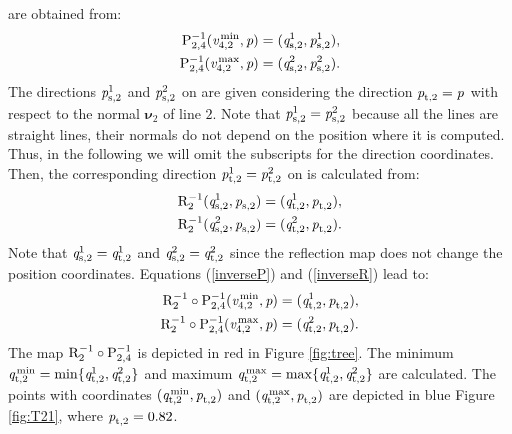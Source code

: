 are obtained from:
\begin{equation}\label{inverseP}
\begin{split}
 \mathrm{P}_{{2,4}}^{-1}
(\textit{v}_{4,2}^\textrm{\,min}, \textit{p}) &=  (\textit{q}_{\textrm{s,} \textit{$2$}}^1, \textit{p}_{\textrm{s,} \textit{$2$}}^1), \\
 \mathrm{P}_{{2,4}}^{-1}
(\textit{v}_{4,2}^\textrm{\,max}, \textit{p}) &=  (\textit{q}_{\textrm{s,} \textit{$2$}}^2, \textit{p}_{\textrm{s,} \textit{$2$}}^2).
\end{split}
\end{equation}
 The directions
$\textit{p}_{\textrm{s,} \textit{$2$}}^1$ and $\textit{p}_{\textrm{s,} \textit{$2$}}^2 $ on 
are given considering the direction $\textit{p}_{\textrm{t,} \textit{$2$}} = \textit{p}_{\textrm{} \textit{}}$ with respect to the normal
$\boldsymbol{\nu}_{2}$ of line $2$.
 Note that $\textit{p}_{\textrm{s,} \textit{$2$}}^1=\textit{p}_{\textrm{s,} \textit{$2$}}^2$ because all the lines are straight lines, their normals do not depend on the position where it is computed. Thus, in the following we will omit the subscripts for the direction coordinates.
 Then, the corresponding direction $\textit{p}_{\textrm{t,} \textit{$2$}}^1=\textit{p}_{\textrm{t,} \textit{$2$}}^2$ on 
 is calculated from:
\begin{equation}\label{inverseR}
\begin{split}
\mathrm{R}_{{2}}^{-1}(\textit{q}_{\textrm{s,} \textit{$2$}}^1, \textit{p}_{\textrm{s,} \textit{$2$}}) &= (\textit{q}_{\textrm{t,} \textit{$2$}}^1, \textit{p}_{\textrm{t,} \textit{$2$}}), \\
\mathrm{R}_{{2}}^{-1}(\textit{q}_{\textrm{s,} \textit{$2$}}^2, \textit{p}_{\textrm{s,} \textit{$2$}}) &= (\textit{q}_{\textrm{t,} \textit{$2$}}^2, \textit{p}_{\textrm{t,} \textit{$2$}}).
\end{split}
\end{equation}
Note that $\textit{q}_{\textrm{s,} \textit{$2$}}^1 = \textit{q}_{\textrm{t,} \textit{$2$}}^1$ and $\textit{q}_{\textrm{s,} \textit{$2$}}^2= \textit{q}_{\textrm{t,} \textit{$2$}}^2$ since the reflection map does not change the position coordinates.
 Equations (\ref{inverseP}) and (\ref{inverseR}) lead to: \begin{equation}
\begin{split}
\mathrm{R}_{{2}}^{-1}\circ \mathrm{P}_{{2,4}}^{-1}(\textit{v}_{4,2}^\textrm{\,min}, \textit{p}) &= (\textit{q}_{\textrm{t,} \textit{$2$}}^1, \textit{p}_{\textrm{t,} \textit{$2$}}),\\
\mathrm{R}_{{2}}^{-1}\circ \mathrm{P}_{{2,4}}^{-1}(\textit{v}_{4,2}^\textrm{\,max}, \textit{p}) &= (\textit{q}_{\textrm{t,} \textit{$2$}}^2, \textit{p}_{\textrm{t,} \textit{$2$}}).
\end{split}
\end{equation} The map $\mathrm{R}_{{2}}^{-1}\circ \mathrm{P}_{{2,4}}^{-1}$  is depicted in red in Figure \ref{fig:tree}.
The minimum 
 $\textit{q}_{\textrm{t,} \textit{$2$}}^\textrm{\,min} = \min\{\textit{q}_{\textrm{t,} \textit{$2$}}^1, \textit{q}_{\textrm{t,} \textit{$2$}}^2\}$ and maximum
 $\textit{q}_{\textrm{t,} \textit{$2$}}^\textrm{\,max} = \max\{\textit{q}_{\textrm{t,} \textit{$2$}}^1, \textit{q}_{\textrm{t,} \textit{$2$}}^2\}$ are calculated. The points with coordinates  $(\textit{q}_{\textrm{t,} \textit{$2$}}^\textrm{\,min}, \textit{p}_{\textrm{t,} \textit{$2$}})$  and  $(\textit{q}_{\textrm{t,} \textit{$2$}}^\textrm{\,max}, \textit{p}_{\textrm{t,} \textit{$2$}})$  are depicted in blue Figure \ref{fig:T21}, where $\textit{p}_{\textrm{t,} \textit{$2$}}=0.82$.
